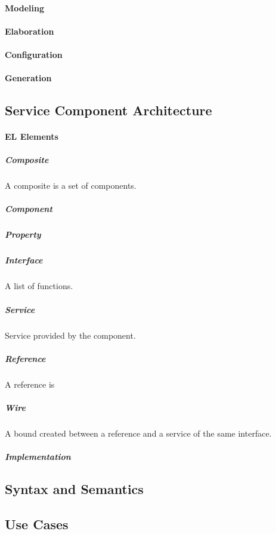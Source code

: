 \documentclass{report}
\begin{document}
			\paragraph{Modeling}

			\paragraph{Elaboration}

			\paragraph{Configuration}

			\paragraph{Generation}

		\subsection{Service Component Architecture}
		
		\par 

			\paragraph{EL Elements}

			\subparagraph{Composite} A composite is a set of components.

			\subparagraph{Component} 
			
			\subparagraph{Property}

			\subparagraph{Interface} A list of functions.

			\subparagraph{Service} Service provided by the component.

			\subparagraph{Reference} A reference is 

			\subparagraph{Wire} A bound created between a reference and a service of the same interface.

			\subparagraph{Implementation}

		\subsection{Syntax and Semantics}

		\subsection{Use Cases}
\end{document}
